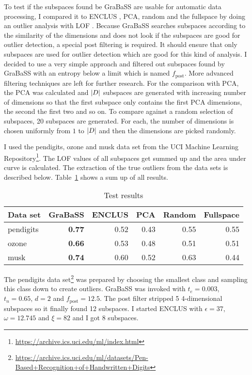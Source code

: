 To test if the subspaces found be GraBaSS are usable for automatic data processing, I compared it to ENCLUS \cite{enclus}, PCA, random and the fullspace by doing an outlier analysis with LOF \cite{lof}. Because GraBaSS searches subspaces according to the similarity of the dimensions and does not look if the subspaces are good for outlier detection, a special post filtering is required. It should ensure that only subspaces are used for outlier detection which are good for this kind of analysis. I decided to use a very simple approach and filtered out subspaces found by GraBaSS with an entropy below a limit which is named $f_\mathrm{post}$. More advanced filtering techniques are left for further research. For the comparison with PCA, the PCA was calculated and $\left|D\right|$ subspaces are generated with increasing number of dimensions so that the first subspace only contains the first PCA dimensions, the second the first two and so on. To compare against a random selection of subspaces, 20 subspaces are generated. For each, the number of dimensions is chosen uniformly from $1$ to $\left|D\right|$ and then the dimensions are picked randomly.

I used the pendigits, ozone and musk data set from the UCI Machine Learning Repository\footnote{\url{https://archive.ics.uci.edu/ml/index.html}}. The LOF values of all subspaces get summed up and the area under curve is calculated. The extraction of the true outliers from the data sets is described below. Table~\ref{tab:tests} shows a sum up of all results.

\begin{table}
	\caption{Test results}
	\label{tab:tests}
	\centering
	\begin{tabular}{lrrrrr}
		\toprule
		\textbf{Data set} & \textbf{GraBaSS} & \textbf{ENCLUS} & \textbf{PCA} & \textbf{Random} & \textbf{Fullspace} \\
		\midrule
		pendigits & \textbf{\num[detect-weight]{0.77}} & \num{0.52} & \num{0.43} & \num{0.55} & \num{0.55} \\
		ozone & \textbf{\num[detect-weight]{0.66}} & \num{0.53} & \num{0.48} & \num{0.51} & \num{0.51} \\
		musk & \textbf{\num[detect-weight]{0.74}} & \num{0.60} & \num{0.52} & \num{0.63} & \num{0.44} \\
		\bottomrule
	\end{tabular}
\end{table}

The pendigits data set\footnote{\url{https://archive.ics.uci.edu/ml/datasets/Pen-Based+Recognition+of+Handwritten+Digits}} was prepared by choosing the smallest class and sampling this class down to create outliers. GraBaSS was invoked with $t_e = 0.003$, $t_n = 0.65$, $d = 2$ and $f_\mathrm{post} = 12.5$. The post filter stripped \num{5} 4-dimensional subspaces so it finally found \num{12} subspaces. I started ENCLUS with $\epsilon = 37$, $\omega = 12.745$ and $\xi = 82$ and I got \num{8} subspaces.

